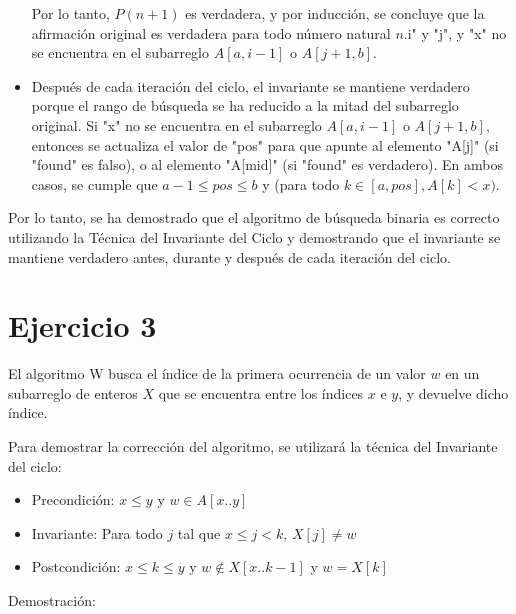 \documentclass{article}
\begin{document}
\begin{itemize}
Por lo tanto, $P(n+1)$ es verdadera, y por inducción, se concluye que la afirmación original es verdadera para todo número natural $n$.i" y "j", y "x" no se encuentra en el subarreglo 
    $A[a, i-1]$ o $A[j+1, b]$.
    
    \item Después de cada iteración del ciclo, el invariante se mantiene verdadero porque el rango de búsqueda se ha reducido a la 
    mitad del subarreglo original. Si "x" no se encuentra en el subarreglo $A[a, i-1]$ o $A[j+1, b]$, entonces se actualiza el valor de 
    "pos" para que apunte al elemento "A[j]" (si "found" es falso), o al elemento "A[mid]" (si "found" es verdadero). En ambos casos, 
    se cumple que $a-1 \leq pos \leq b$ y (para todo $k \in [a, pos], A[k] < x)$.

    
\end{itemize}
    
    Por lo tanto, se ha demostrado que el algoritmo de búsqueda binaria es correcto utilizando la Técnica del Invariante del Ciclo y demostrando que el invariante se mantiene verdadero antes, durante y después de cada iteración del ciclo.

\newpage
\section{Ejercicio 3}
    El algoritmo W busca el índice de la primera ocurrencia de un valor $w$ en un subarreglo de enteros $X$ que se encuentra entre los índices $x$ e $y$, y devuelve dicho índice.

    Para demostrar la corrección del algoritmo, se utilizará la técnica del Invariante del ciclo:
    \begin{itemize}
      \item Precondición: $x \leq y$ y $w \in A[x..y]$
      \item Invariante: Para todo $j$ tal que $x \leq j < k$, $X[j] \neq w$
      \item Postcondición: $x \leq k \leq y$ y $w \notin X[x..k-1]$ y $w = X[k]$
      \end{itemize}

    Demostración:
\end{document}
